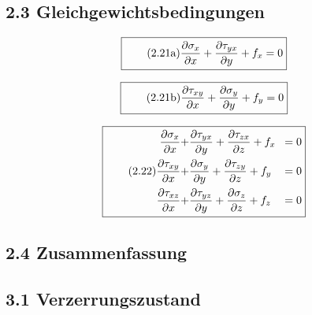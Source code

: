 \documentclass[11pt]{article}
\newcommand{\1}{ {\mathds{1}} }
\begin{document}
    \subsection*{2.3 Gleichgewichtsbedingungen}

    \begin{equation}
      \boxed{
        \tag{2.21a}
        \begin{split}
          \frac{\partial\sigma_x}{\partial x}
          +
          \frac{\partial\tau_{yx}}{\partial y}
          +
          f_x
          =
          0
        \end{split}
      }
    \end{equation}

    \begin{equation}
      \boxed{
        \tag{2.21b}
        \begin{split}
          \frac{\partial\tau_{xy}}{\partial x}
          +
          \frac{\partial\sigma_{y}}{\partial y}
          +
          f_y
          =
          0
        \end{split}
      }
    \end{equation}

    \begin{equation}
      \boxed{
        \tag{2.22}
        \begin{split}
          \frac{\partial\sigma_{x}}{\partial x}
          +
          &\frac{\partial\tau_{yx}}{\partial y}
          +
          \frac{\partial\tau_{zx}}{\partial z}
          +
          f_x\!&= 0 \\
          \frac{\partial\tau_{xy}}{\partial x}
          +
          &\frac{\partial\sigma_{y}}{\partial y}
          +
          \frac{\partial\tau_{zy}}{\partial z}
          +
          f_y\!&= 0 \\
          \frac{\partial\tau_{xz}}{\partial x}
          +
          &\frac{\partial\tau_{yz}}{\partial y}
          +
          \frac{\partial\sigma_{z}}{\partial z}
          +
          f_z\!&= 0 \\
        \end{split}
      }
    \end{equation}    

    \subsection*{2.4 Zusammenfassung}

    \subsection*{3.1 Verzerrungszustand}
\end{document}
